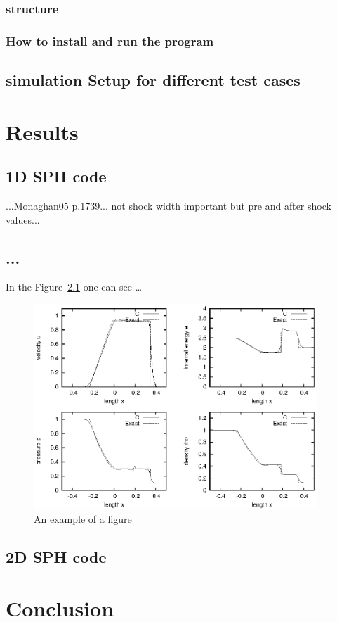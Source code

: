 \documentclass{report}
\begin{document}
\subsection{structure}
\label{sec:Struc2DCode}



\subsection{How to install and run the program}
\label{sec:HowToInstAndRun2D}


\section{simulation Setup for different test cases}
\label{sec:simuSetupTestCases}



\chapter{Results}
\section{1D SPH code}
...Monaghan05 p.1739... not shock width important but pre and after shock values...

\section{...}
\label{sec:results}

In the Figure~\ref{fig:1dshock} one can see \ldots

\begin{figure}[h]
  \centering
  \includegraphics[width=0.95\textwidth]{img/1dshock.eps}
  \caption{An example of a figure}
  \label{fig:1dshock}
\end{figure}

\section{2D SPH code}



\chapter{Conclusion}
\label{sec:conclusion}

\listoffigures



\end{document}
